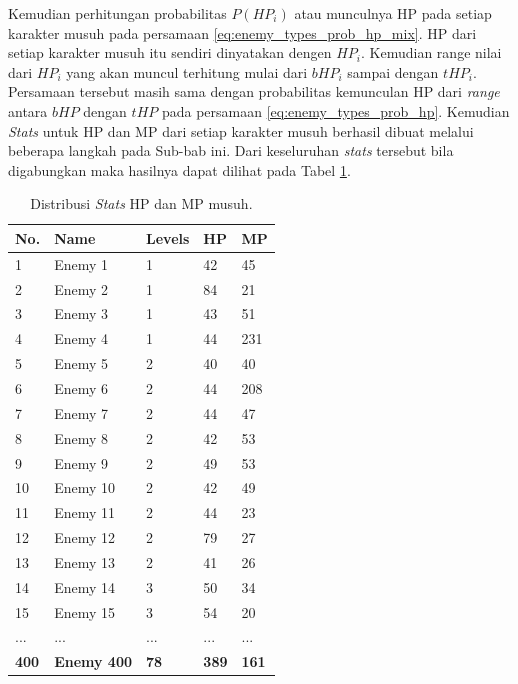 Kemudian perhitungan probabilitas $P(HP_{i})$ atau munculnya HP pada setiap karakter musuh pada persamaan \ref{eq:enemy_types_prob_hp_mix}. HP dari setiap karakter musuh itu sendiri dinyatakan dengen $HP_{i}$. Kemudian range nilai dari $HP_{i}$ yang akan muncul terhitung mulai dari $bHP_{i}$ sampai dengan $tHP_{i}$. Persamaan tersebut masih sama dengan probabilitas kemunculan HP dari \textit{range} antara $bHP$ dengan $tHP$ pada persamaan \ref{eq:enemy_types_prob_hp}. Kemudian \textit{Stats} untuk HP dan MP dari setiap karakter musuh berhasil dibuat melalui beberapa langkah pada Sub-bab ini. Dari keseluruhan \textit{stats} tersebut bila digabungkan maka hasilnya dapat dilihat pada Tabel \ref{tb:enemy_weak_stats}.
\vspace{-3ex}

\begin{longtable}{|l|l|l|l|l|}
	\caption{Distribusi \textit{Stats} HP dan MP musuh.}
	\label{tb:enemy_weak_stats}\\
	\hline
	\textbf{No.} & \textbf{Name} & \textbf{Levels} & \textbf{HP} & \textbf{MP} \\ \hline
	1 & Enemy 1 & 1 & 42 & 45 \\ \hline
	2 & Enemy 2 & 1 & 84 & 21 \\ \hline
	3 & Enemy 3 & 1 & 43 & 51 \\ \hline
	4 & Enemy 4 & 1 & 44 & 231 \\ \hline
	5 & Enemy 5 & 2 & 40 & 40 \\ \hline
	6 & Enemy 6 & 2 & 44 & 208 \\ \hline
	7 & Enemy 7 & 2 & 44 & 47 \\ \hline
	8 & Enemy 8 & 2 & 42 & 53 \\ \hline
	9 & Enemy 9 & 2 & 49 & 53 \\ \hline
	10 & Enemy 10 & 2 & 42 & 49 \\ \hline
	11 & Enemy 11 & 2 & 44 & 23 \\ \hline
	12 & Enemy 12 & 2 & 79 & 27 \\ \hline
	13 & Enemy 13 & 2 & 41 & 26 \\ \hline
	14 & Enemy 14 & 3 & 50 & 34 \\ \hline
	15 & Enemy 15 & 3 & 54 & 20 \\ \hline
	... & ... & ... & ... & ... \\ \hline
	\textbf{400} & \textbf{Enemy 400} & \textbf{78} & \textbf{389} & \textbf{161} \\ \hline
\end{longtable}

